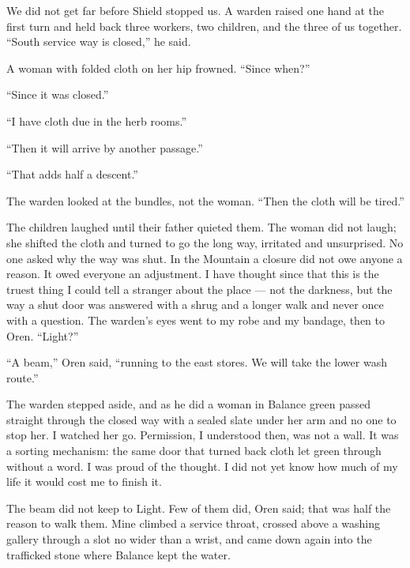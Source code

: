 \ornament

\noindent We did not get far before Shield stopped us. A warden raised one hand at the first turn and held back three workers, two children, and the three of us together. ``South service way is closed,'' he said.\par

A woman with folded cloth on her hip frowned. ``Since when?''\par

``Since it was closed.''\par

``I have cloth due in the herb rooms.''\par

``Then it will arrive by another passage.''\par

``That adds half a descent.''\par

The warden looked at the bundles, not the woman. ``Then the cloth will be tired.''\par

The children laughed until their father quieted them. The woman did not laugh; she shifted the cloth and turned to go the long way, irritated and unsurprised. No one asked why the way was shut. In the Mountain a closure did not owe anyone a reason. It owed everyone an adjustment. I have thought since that this is the truest thing I could tell a stranger about the place --- not the darkness, but the way a shut door was answered with a shrug and a longer walk and never once with a question. The warden's eyes went to my robe and my bandage, then to Oren. ``Light?''\par

``A beam,'' Oren said, ``running to the east stores. We will take the lower wash route.''\par

The warden stepped aside, and as he did a woman in Balance green passed straight through the closed way with a sealed slate under her arm and no one to stop her. I watched her go. Permission, I understood then, was not a wall. It was a sorting mechanism: the same door that turned back cloth let green through without a word. I was proud of the thought. I did not yet know how much of my life it would cost me to finish it.\par

\ornament

\noindent The beam did not keep to Light. Few of them did, Oren said; that was half the reason to walk them. Mine climbed a service throat, crossed above a washing gallery through a slot no wider than a wrist, and came down again into the trafficked stone where Balance kept the water.\par

